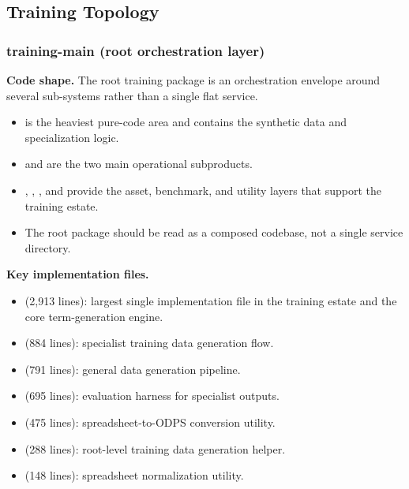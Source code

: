 \documentclass[11pt,a4paper]{article}
\begin{document}
\subsection{Training Topology}

\subsubsection{training-main (root orchestration layer)}

\textbf{Code shape.} The root training package is an orchestration envelope around several sub-systems rather than a single flat service.
\begin{itemize}[leftmargin=*]
    \item {} is the heaviest pure-code area and contains the synthetic data and specialization logic.
    \item {} and  are the two main operational subproducts.
    \item {}, , , and  provide the asset, benchmark, and utility layers that support the training estate.
    \item The root package should be read as a composed codebase, not a single service directory.
\end{itemize}

\textbf{Key implementation files.}
\begin{itemize}[leftmargin=*]
    \item {} (2,913 lines): largest single implementation file in the training estate and the core term-generation engine.
    \item {} (884 lines): specialist training data generation flow.
    \item {} (791 lines): general data generation pipeline.
    \item {} (695 lines): evaluation harness for specialist outputs.
    \item {} (475 lines): spreadsheet-to-ODPS conversion utility.
    \item {} (288 lines): root-level training data generation helper.
    \item {} (148 lines): spreadsheet normalization utility.
\end{itemize}
\end{document}
